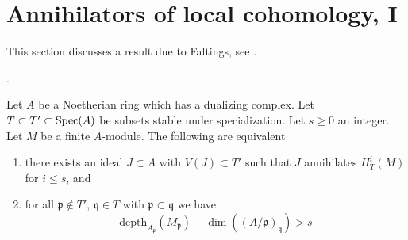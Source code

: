 \section{Annihilators of local cohomology, I}
\label{section-annihilators}

\noindent
This section discusses a result due to Faltings, see
\cite{Faltings-annulators}.

\begin{proposition}
\label{proposition-annihilator}
\begin{reference}
\cite{Faltings-annulators}.
\end{reference}
Let $A$ be a Noetherian ring which has a dualizing complex.
Let $T \subset T' \subset \mathop{\mathrm{Spec}}(A)$ be subsets stable under
specialization. Let $s \geq 0$ an integer. Let $M$ be a finite $A$-module.
The following are equivalent
\begin{enumerate}
\item there exists an ideal $J \subset A$ with $V(J) \subset T'$
such that $J$ annihilates $H^i_T(M)$ for $i \leq s$, and
\item for all $\mathfrak p \not \in T'$,
$\mathfrak q \in T$ with $\mathfrak p \subset \mathfrak q$
we have
$$
\text{depth}_{A_\mathfrak p}(M_\mathfrak p) +
\dim((A/\mathfrak p)_\mathfrak q) > s
$$
\end{enumerate}
\end{proposition}

